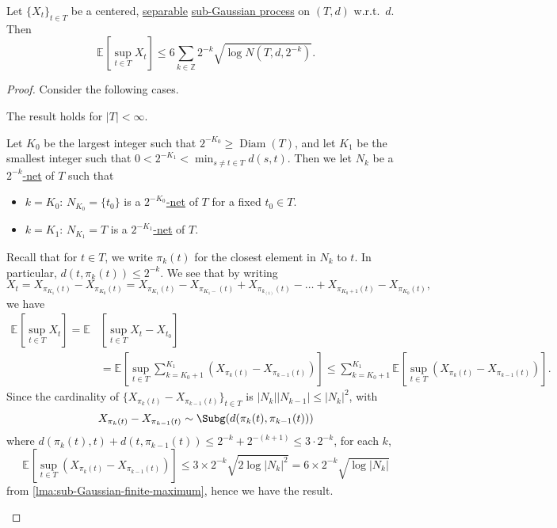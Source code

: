 \begin{theorem}\label{thm:Dudley-entropy-bound}
	Let \(\{ X_t \} _{t\in T}\) be a centered, \hyperref[def:separable]{separable} \hyperref[def:sub-Gaussian-process]{sub-Gaussian process} on \((T, d)\) w.r.t.\ \(d\). Then
	\[
		\mathbb{E}_{}\left[\sup _{t\in T} X_t \right] \leq 6 \sum_{k\in \mathbb{Z} } 2^{-k} \sqrt{\log N(T, d, 2^{-k})} .
	\]
\end{theorem}
\begin{proof}
	Consider the following cases.
	\begin{claim}
		The result holds for \(\vert T \vert < \infty \).
	\end{claim}
	\begin{explanation}
		Let \(K_0\) be the largest integer such that \(2^{-K_0} \geq \mathop{\mathrm{Diam}}(T) \), and let \(K_1\) be the smallest integer such that \(0 < 2^{-K_1} < \min _{s \neq t\in T} d(s, t)\). Then we let \(N_k\) be a \hyperref[def:eps-net]{\(2^{-k}\)-net} of \(T\) such that
		\begin{itemize}
			\item \(k = K_0\): \(N_{K_0} = \{ t_0 \} \) is a \hyperref[def:eps-net]{\(2^{-K_0}\)-net} of \(T\) for a fixed \(t_0\in T\).
			\item \(k = K_1\): \(N_{K_1} = T\) is a \hyperref[def:eps-net]{\(2^{-K_1}\)-net} of \(T\).
		\end{itemize}
		Recall that for \(t\in T\), we write \(\pi _k(t)\) for the closest element in \(N_k\) to \(t\). In particular, \(d(t, \pi _k(t)) \leq 2^{-k}\). We see that by writing
		\[
			X_t
			= X_{\pi _{K_1} (t)} - X_{\pi _{K_0} (t)}
			= X_{\pi _{K_1}(t)} - X_{\pi _{K_1 - } (t)} + X_{\pi _{k_{(1)}} (t)} - \dots + X_{\pi _{K_0 + 1} (t)} - X_{\pi _{K_0} (t)},
		\]
		we have
		\[
			\begin{split}
				\mathbb{E}_{}\left[\sup _{t\in T} X_t \right]
				= \mathbb{E}_{}&\left[\sup _{t\in T} X_t - X_{t_0} \right]\\
				&= \mathbb{E}_{}\left[\sup _{t\in T} \sum_{k=K_0 + 1}^{K_1} \left( X_{\pi _k (t)} - X_{\pi _{k-1}(t)} \right) \right]
				\leq \sum_{k=K_0 + 1}^{K_1} \mathbb{E}_{}\left[\sup _{t\in T} \left( X_{\pi _k(t)} - X_{\pi _{k-1} (t)} \right) \right].
			\end{split}
		\]
		Since the cardinality of \(\{ X_{\pi _k(t)} - X_{\pi _{k-1} (t)} \}_{t\in T}\) is \(\vert N_k \vert \vert N_{k-1} \vert \leq \vert N_k \vert ^2\), with
		\[
			X_{\pi _k(t)} - X_{\pi _{k-1}(t)} \sim \Subg(d(\pi _k(t), \pi _{k-1}(t)))
		\]
		where \(d(\pi _k(t), t) + d(t, \pi _{k-1}(t)) \leq 2^{-k} + 2^{-(k+1)} \leq 3\cdot 2^{-k}\), for each \(k\),
		\[
			\mathbb{E}_{}\left[\sup _{t\in T} \left( X_{\pi _k(t)} - X_{\pi _{k-1}(t)} \right) \right]
			\leq 3 \times 2^{-k} \sqrt{2 \log \vert N_k \vert ^2}
			= 6 \times 2^{-k} \sqrt{\log \vert N_k \vert }
		\]
		from \autoref{lma:sub-Gaussian-finite-maximum}, hence we have the result.
	\end{explanation}


\end{proof}
